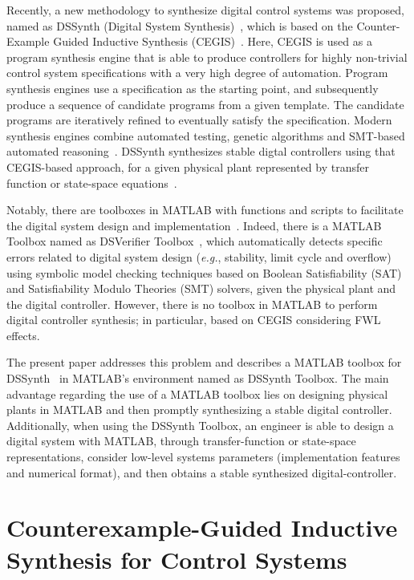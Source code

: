 \documentclass[10pt,conference]{IEEEtran}
\newcommand\tool{{DSSynth Toolbox}\xspace}
\begin{document}
Recently, a new methodology to synthesize digital control systems was proposed, 
named as DSSynth (Digital System Synthesis)~\cite{abate2017, abatecav2017}, 
which is based on the Counter-Example Guided Inductive Synthesis 
(CEGIS)~\cite{DBLP:conf/asplos/Solar-LezamaTBSS06}. Here, CEGIS is used
as a program synthesis engine that is able to produce controllers for highly non-trivial 
control system specifications with a very high degree of automation. Program synthesis engines 
use a specification as the starting point, and subsequently produce a sequence of candidate 
programs from a given template. The candidate programs are iteratively refined to eventually 
satisfy the specification. Modern synthesis engines combine automated testing, genetic algorithms 
and SMT-based automated reasoning~\cite{DBLP:journals/corr/AlurFSS16a, DBLP:conf/lpar/DavidKL15}. 
DSSynth synthesizes stable digtal controllers using that CEGIS-based approach,
for a given physical plant represented by transfer function or state-space equations~\cite{abate2017,abatecav2017}.

Notably, there are toolboxes in MATLAB with functions and scripts to facilitate the 
digital system design and implementation~\cite{matlab-toolbox}. Indeed, there is a MATLAB 
Toolbox named as DSVerifier Toolbox~\cite{issta2017}, which automatically detects 
specific errors related to digital system design ({\it e.g.}, stability, limit cycle and overflow) 
using symbolic model checking techniques based on Boolean Satisfiability (SAT) and 
Satisfiability Modulo Theories (SMT) solvers, given the physical plant and the digital controller. 
However, there is no toolbox in MATLAB to perform digital controller synthesis; in particular, based on 
CEGIS considering FWL effects.

The present paper addresses this problem and describes a MATLAB toolbox for DSSynth~\cite{abate2017, abatecav2017} 
in MATLAB's environment named as \tool. The main advantage regarding the use of a MATLAB toolbox 
lies on designing physical plants in MATLAB and then promptly synthesizing a stable digital controller. 
Additionally, when using the \tool, an engineer is able to design a digital system with MATLAB, 
through transfer-function or state-space representations, consider low-level systems parameters 
(implementation features and numerical format), and then obtains a stable synthesized digital-controller.

\section{Counterexample-Guided Inductive Synthesis for Control Systems}
\end{document}
